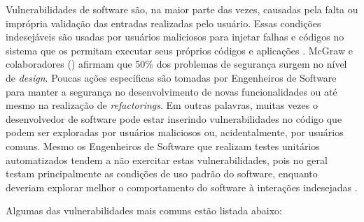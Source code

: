 Vulnerabilidades de software são, na maior parte das vezes, causadas pela falta ou imprópria validação das entradas realizadas pelo usuário. Essas condições indesejáveis são usadas por usuários maliciosos para injetar falhas e códigos no sistema que os permitam executar seus próprios códigos e aplicações  \cite{jimenez2009}. McGraw e colaboradores (\citeyear{mcgraw2004}) afirmam que 50\% dos problemas de segurança surgem no nível de \emph{design}. Poucas ações específicas são tomadas por Engenheiros de Software para manter a segurança no desenvolvimento de novas funcionalidades ou até mesmo na realização de \emph{refactorings}. Em outras palavras, muitas vezes o desenvolvedor de software pode estar inserindo vulnerabilidades no código que podem ser exploradas por usuários maliciosos ou, acidentalmente, por usuários comuns. Mesmo os Engenheiros de Software que realizam testes unitários automatizados tendem a não exercitar estas vulnerabilidades, pois no geral testam principalmente as condições de uso padrão do software, enquanto deveriam explorar melhor o comportamento do software à interações indesejadas \cite{vries2006}.

%

Algumas das vulnerabilidades mais comuns estão listada abaixo:

%

